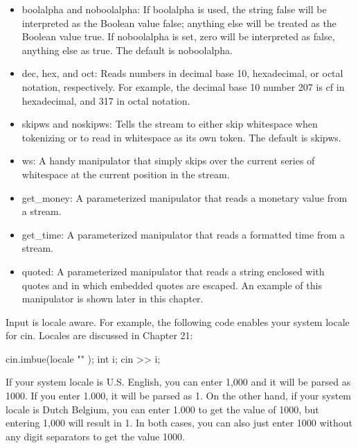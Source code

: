 \begin{itemize}
\item
boolalpha and noboolalpha: If boolalpha is used, the string false will be interpreted as the Boolean value false; anything else will be treated as the Boolean value true. If noboolalpha is set, zero will be interpreted as false, anything else as true. The default is noboolalpha.

\item
dec, hex, and oct: Reads numbers in decimal base 10, hexadecimal, or octal notation, respectively. For example, the decimal base 10 number 207 is cf in hexadecimal, and 317 in octal notation.

\item
skipws and noskipws: Tells the stream to either skip whitespace when tokenizing or to read in whitespace as its own token. The default is skipws.

\item
ws: A handy manipulator that simply skips over the current series of whitespace at the current position in the stream.

\item
get\_money: A parameterized manipulator that reads a monetary value from a stream.

\item
get\_time: A parameterized manipulator that reads a formatted time from a stream.

\item
quoted: A parameterized manipulator that reads a string enclosed with quotes and in which embedded quotes are escaped. An example of this manipulator is shown later in this chapter.
\end{itemize}

Input is locale aware. For example, the following code enables your system locale for cin. Locales are discussed in Chapter 21:

\begin{cpp}
cin.imbue(locale { "" });
int i;
cin >> i;
\end{cpp}

If your system locale is U.S. English, you can enter 1,000 and it will be parsed as 1000. If you enter 1.000, it will be parsed as 1. On the other hand, if your system locale is Dutch Belgium, you can enter 1.000 to get the value of 1000, but entering 1,000 will result in 1. In both cases, you can also just enter 1000 without any digit separators to get the value 1000.





